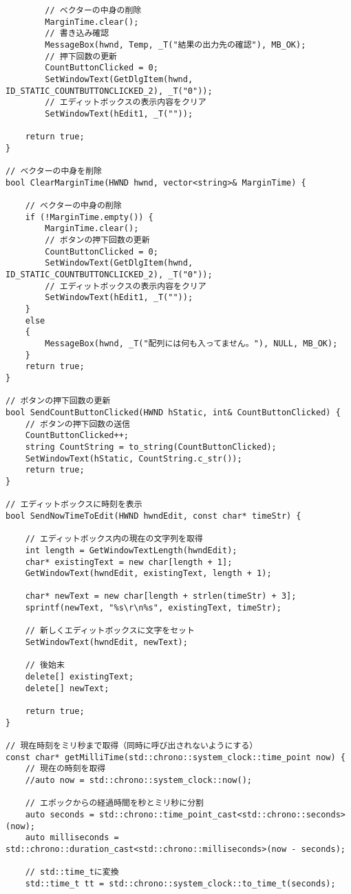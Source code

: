 \begin{verbatim}
		// ベクターの中身の削除
		MarginTime.clear();
		// 書き込み確認
		MessageBox(hwnd, Temp, _T("結果の出力先の確認"), MB_OK);
		// 押下回数の更新
		CountButtonClicked = 0;
		SetWindowText(GetDlgItem(hwnd, ID_STATIC_COUNTBUTTONCLICKED_2), _T("0"));
		// エディットボックスの表示内容をクリア
		SetWindowText(hEdit1, _T(""));

	return true;
}

// ベクターの中身を削除
bool ClearMarginTime(HWND hwnd, vector<string>& MarginTime) {

	// ベクターの中身の削除
	if (!MarginTime.empty()) {
		MarginTime.clear();
		// ボタンの押下回数の更新
		CountButtonClicked = 0;
		SetWindowText(GetDlgItem(hwnd, ID_STATIC_COUNTBUTTONCLICKED_2), _T("0"));
		// エディットボックスの表示内容をクリア
		SetWindowText(hEdit1, _T(""));
	}
	else
	{
		MessageBox(hwnd, _T("配列には何も入ってません。"), NULL, MB_OK);
	}
	return true;
}

// ボタンの押下回数の更新
bool SendCountButtonClicked(HWND hStatic, int& CountButtonClicked) {
	// ボタンの押下回数の送信
	CountButtonClicked++;
	string CountString = to_string(CountButtonClicked);
	SetWindowText(hStatic, CountString.c_str());
	return true;
}

// エディットボックスに時刻を表示
bool SendNowTimeToEdit(HWND hwndEdit, const char* timeStr) {

	// エディットボックス内の現在の文字列を取得
	int length = GetWindowTextLength(hwndEdit);
	char* existingText = new char[length + 1];
	GetWindowText(hwndEdit, existingText, length + 1);

	char* newText = new char[length + strlen(timeStr) + 3];
	sprintf(newText, "%s\r\n%s", existingText, timeStr);

	// 新しくエディットボックスに文字をセット
	SetWindowText(hwndEdit, newText);

	// 後始末
	delete[] existingText;
	delete[] newText;

	return true;
}

// 現在時刻をミリ秒まで取得（同時に呼び出されないようにする）
const char* getMilliTime(std::chrono::system_clock::time_point now) {
	// 現在の時刻を取得
	//auto now = std::chrono::system_clock::now();

	// エポックからの経過時間を秒とミリ秒に分割
	auto seconds = std::chrono::time_point_cast<std::chrono::seconds>(now);
	auto milliseconds = std::chrono::duration_cast<std::chrono::milliseconds>(now - seconds);

	// std::time_tに変換
	std::time_t tt = std::chrono::system_clock::to_time_t(seconds);


\end{verbatim}
